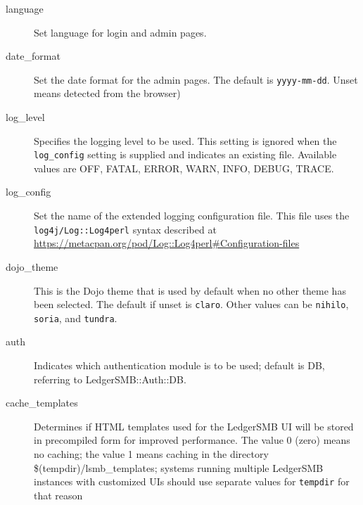 \begin{description}
        \item[language] Set language for login and admin pages. 
        \item[date\_format] Set the date format for the admin pages.  The default is \texttt{yyyy-mm-dd}. Unset means detected from the browser)
        \item[log\_level] Specifies the logging level to be used. This setting is ignored when the \texttt{log\_config} setting 
        is supplied and indicates an existing file. Available values are OFF, FATAL, ERROR, WARN, INFO, DEBUG, TRACE.
        \item [log\_config] Set the name of the extended logging configuration file. This file uses the \texttt{log4j/Log::Log4perl} syntax described at \url{https://metacpan.org/pod/Log::Log4perl#Configuration-files}
        \item [dojo\_theme] This is the Dojo theme that is used by default when no other theme
        has been selected.  The default if unset is \texttt{claro}. Other values can be \texttt{nihilo}, \texttt{soria}, and \texttt{tundra}.
        \item[auth] Indicates which authentication module is to be used; default is DB, referring to LedgerSMB::Auth::DB.
        \item[cache\_templates] Determines if HTML templates used for the LedgerSMB UI will be stored
        in precompiled form for improved performance. The value 0 (zero) means no caching; the value
        1 means caching in the directory \$(tempdir)/lsmb\_templates; systems running multiple
        LedgerSMB instances with customized UIs should use separate values for {\tt tempdir} for that
        reason

        
\end{description}

